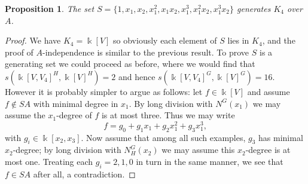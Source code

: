 \documentclass[a4paper]{amsart}
\newcommand{\kk}{\Bbbk}
\newtheorem{prop}[Lemma]{Proposition}
\newtheorem*{Corollary of Conjecture}{Corollary of Conjecture}
\theoremstyle{definition}
\theoremstyle{remark}
\theoremstyle{Acknowledgments}
\begin{document}
\begin{prop}
The set $S = \{1,x_1,x_2,x_1^2,x_1x_2,x_1^3,x_1^2x_2,x_1^3x_2\}$ generates $K_4$ over $A$.
\end{prop}

\begin{proof}
We have $K_4 = \kk[V]$ so obviously each element of $S$ lies in $K_4$, and the proof of $A$-independence is similar to the previous result. To prove $S$ is a generating set we could proceed as before, where we would find that  $s(\kk[V,V_4]^H, \kk[V]^H) = 2$ and hence  $s(\kk[V,V_4]^G, \kk[V]^G) = 16$. However it is probably simpler to argue as follows: let $f \in \kk[V]$ and assume $f \not \in SA$ with minimal degree in $x_1$. By long division with $N^G(x_1)$ we may assume the $x_1$-degree of $f$ is at most three. Thus we may write
\[f = g_0+g_1x_1+g_2x_1^2+g_3x_1^3,\]
with $g_i \in \kk[x_2,x_3]$. Now assume that among all such examples, $g_3$ has minimal $x_2$-degree; by long division with $N^G_H(x_2)$ we may assume this $x_2$-degree is at most one. Treating each $g_i = 2,1,0$ in turn in the same manner, we see that $f \in SA$ after all, a contradiction.
\end{proof}



\end{document}
